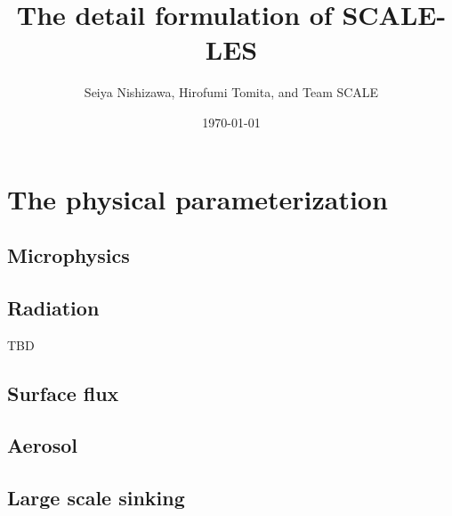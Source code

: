 \documentclass[a4paper]{report}
\title{{\LARGE The detail formulation of SCALE-LES}}
\author{Seiya Nishizawa, Hirofumi Tomita, and Team SCALE}
\date{\today}
\begin{document}
\maketitle
\tableofcontents


















\chapter{The physical parameterization}



\section{Microphysics}


\section{Radiation}
{\Huge TBD}

\section{Surface flux}


\section{Aerosol}


\section{Large scale sinking}





\appendix






\end{document}
